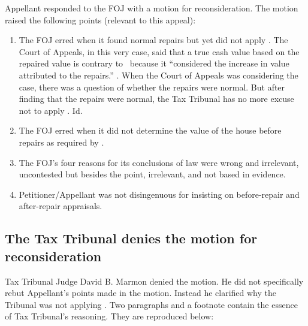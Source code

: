 \documentclass[12pt,\documentclassflag]{michiganCourtOfAppealsBrief}
\begin{document}
Appellant responded to the FOJ with a motion for reconsideration. The motion raised the following points (relevant to this appeal):
\begin{enumerate}
\item The FOJ erred when it found normal repairs but yet did not apply \mathieuGast. The Court of Appeals, in this very case, said that a true cash value based on the repaired value is contrary to \mathieuGast\ because it ``considered the increase in value attributed to the repairs.'' \motionForReconsideration[1]. When the Court of Appeals was considering the case, there was a question of whether the repairs were normal. But after finding that the repairs were normal, the Tax Tribunal has no more excuse not to apply \mathieuGast. Id.
\item The FOJ erred when it did not determine the value of the house before repairs as required by \mathieuGast. 
\item The FOJ's four reasons for its conclusions of law were wrong and irrelevant, uncontested but besides the point, irrelevant, and not based in evidence.
\item Petitioner/Appellant was not disingenuous for insisting on before-repair and after-repair appraisals.
\end{enumerate}

\subsection{The Tax Tribunal denies the motion for reconsideration}

Tax Tribunal Judge David B. Marmon denied the motion. He did not specifically rebut Appellant's points made in the motion. Instead he clarified why the Tribunal was not applying \mathieuGast. Two paragraphs and a footnote contain the essence of Tax Tribunal's reasoning. They are reproduced below:
\end{document}
